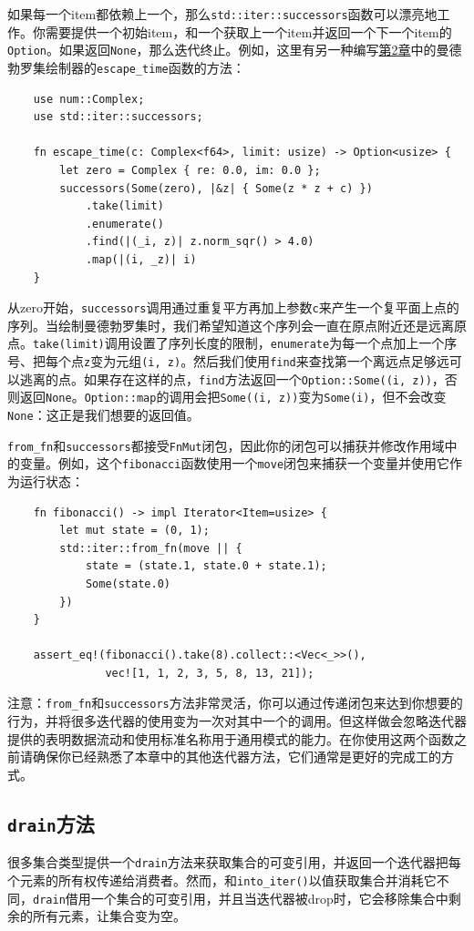 如果每一个item都依赖上一个，那么\texttt{std::iter::successors}函数可以漂亮地工作。你需要提供一个初始item，和一个获取上一个item并返回一个下一个item的\texttt{Option}。如果返回\texttt{None}，那么迭代终止。例如，这里有另一种编写\hyperref[ch02]{第2章}中的曼德勃罗集绘制器的\texttt{escape\_time}函数的方法：
\begin{verbatim}
    use num::Complex;
    use std::iter::successors;

    fn escape_time(c: Complex<f64>, limit: usize) -> Option<usize> {
        let zero = Complex { re: 0.0, im: 0.0 };
        successors(Some(zero), |&z| { Some(z * z + c) })
            .take(limit)
            .enumerate()
            .find(|(_i, z)| z.norm_sqr() > 4.0)
            .map(|(i, _z)| i)
    }
\end{verbatim}

从zero开始，\texttt{successors}调用通过重复平方再加上参数\texttt{c}来产生一个复平面上点的序列。当绘制曼德勃罗集时，我们希望知道这个序列会一直在原点附近还是远离原点。\texttt{take(limit)}调用设置了序列长度的限制，\texttt{enumerate}为每一个点加上一个序号、把每个点\texttt{z}变为元组\texttt{(i, z)}。然后我们使用\texttt{find}来查找第一个离远点足够远可以逃离的点。如果存在这样的点，\texttt{find}方法返回一个\texttt{Option::Some((i, z))}，否则返回\texttt{None}。\texttt{Option::map}的调用会把\texttt{Some((i, z))}变为\texttt{Some(i)}，但不会改变\texttt{None}：这正是我们想要的返回值。

\texttt{from\_fn}和\texttt{successors}都接受\texttt{FnMut}闭包，因此你的闭包可以捕获并修改作用域中的变量。例如，这个\texttt{fibonacci}函数使用一个\texttt{move}闭包来捕获一个变量并使用它作为运行状态：
\begin{verbatim}
    fn fibonacci() -> impl Iterator<Item=usize> {
        let mut state = (0, 1);
        std::iter::from_fn(move || {
            state = (state.1, state.0 + state.1);
            Some(state.0)
        })
    }

    assert_eq!(fibonacci().take(8).collect::<Vec<_>>(),
               vec![1, 1, 2, 3, 5, 8, 13, 21]);
\end{verbatim}

注意：\texttt{from\_fn}和\texttt{successors}方法非常灵活，你可以通过传递闭包来达到你想要的行为，并将很多迭代器的使用变为一次对其中一个的调用。但这样做会忽略迭代器提供的表明数据流动和使用标准名称用于通用模式的能力。在你使用这两个函数之前请确保你已经熟悉了本章中的其他迭代器方法，它们通常是更好的完成工的方式。

\subsection{\texttt{drain}方法}
很多集合类型提供一个\texttt{drain}方法来获取集合的可变引用，并返回一个迭代器把每个元素的所有权传递给消费者。然而，和\texttt{into\_iter()}以值获取集合并消耗它不同，\texttt{drain}借用一个集合的可变引用，并且当迭代器被drop时，它会移除集合中剩余的所有元素，让集合变为空。

